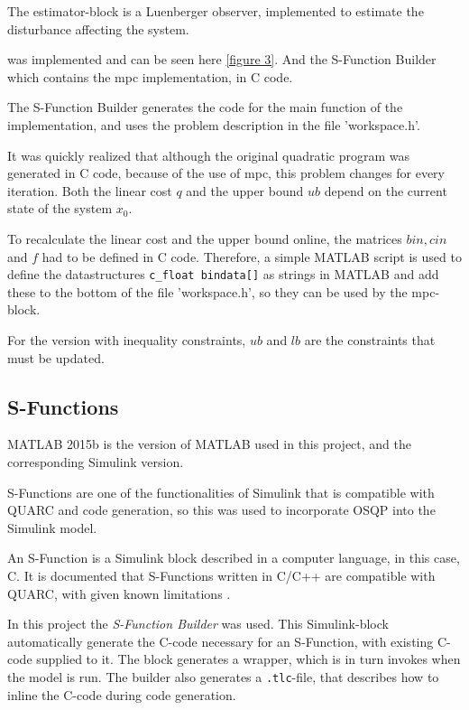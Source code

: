The estimator-block is a Luenberger observer, implemented to estimate the disturbance affecting the system.

was implemented and can be seen here \ref{figure 3}. And the S-Function Builder which contains the \acrshort{mpc} implementation, in C code. 


The S-Function Builder generates the code for the main function of the implementation, and uses the problem description in the file 'workspace.h'. 

It was quickly realized that although the original quadratic program was generated in C code, because of the use of \acrshort{mpc}, this problem changes for every iteration. Both the linear cost $q$ and the upper bound $ub$ depend on the current state of the system $x_0$.

To recalculate the linear cost and the upper bound online, the matrices $bin, cin$ and $f$ had to be defined in C code. Therefore, a simple MATLAB script is used to define the datastructures \verb|c_float bindata[]| as strings in MATLAB and add these to the bottom of the file 'workspace.h', so they can be used by the \acrshort{mpc}-block.

For the version with inequality constraints, $ub$ and $lb$ are the constraints that must be updated. 


\subsection{S-Functions}
MATLAB 2015b is the version of MATLAB used in this project, and the corresponding Simulink version.

S-Functions are one of the functionalities of Simulink that is compatible with QUARC and code generation, so this was used to incorporate OSQP into the Simulink model. 


An S-Function is a Simulink block described in a computer language, in this case,  C. It is documented that S-Functions written in C/C++ are compatible with QUARC, with given known limitations \cite{quarc-s-function}. 

In this project the \textit{S-Function Builder} was used. This Simulink-block automatically generate the C-code necessary for an S-Function, with existing C-code supplied to it. The block generates a wrapper, which is in turn invokes when the model is run. The builder also generates a \verb|.tlc|-file, that describes how to inline the C-code during code generation. 



